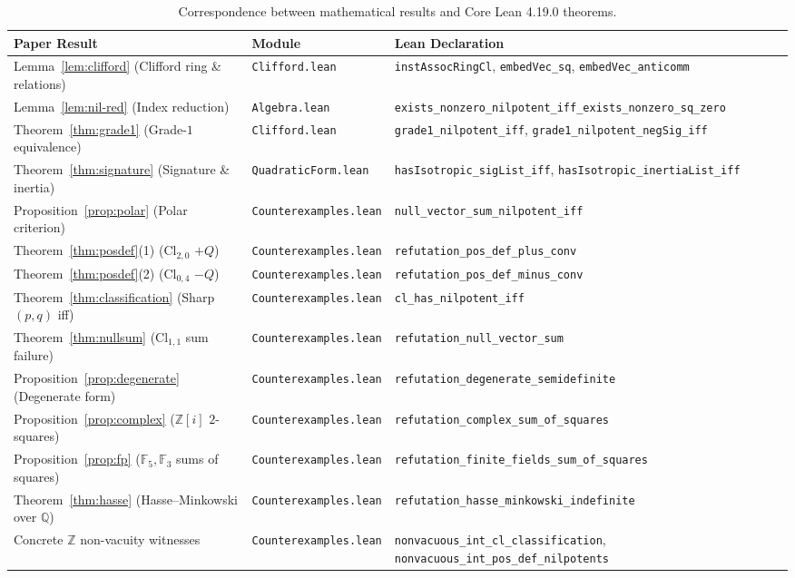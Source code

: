 \documentclass[11pt]{article}
\theoremstyle{definition}
\newcommand{\Cl}{\mathrm{Cl}}
\newcommand{\F}{\mathbb{F}}
\newcommand{\Q}{\mathbb{Q}}
\newcommand{\Z}{\mathbb{Z}}
\begin{document}
\begin{table}[ht]
\centering
\footnotesize
\renewcommand{\arraystretch}{1.16}
\begin{tabular}{@{}>{\raggedright\arraybackslash}p{}>{\raggedright\arraybackslash}p{}>{\raggedright\arraybackslash}p{}@{}}
\toprule
\textbf{Paper Result} & \textbf{Module} & \textbf{Lean Declaration} \\
\midrule
Lemma~\ref{lem:clifford} (Clifford ring \& relations) & \texttt{Clifford.lean} &
\texttt{instAssocRingCl}, \texttt{embedVec\_sq}, \texttt{embedVec\_anticomm} \\
Lemma~\ref{lem:nil-red} (Index reduction) & \texttt{Algebra.lean} &
\texttt{exists\_nonzero\_nilpotent\_iff\_}\penalty0\texttt{exists\_nonzero\_sq\_zero} \\
Theorem~\ref{thm:grade1} (Grade-$1$ equivalence) & \texttt{Clifford.lean} &
\texttt{grade1\_nilpotent\_iff}, \texttt{grade1\_nilpotent\_negSig\_iff} \\
Theorem~\ref{thm:signature} (Signature \& inertia) & \texttt{QuadraticForm.lean} &
\texttt{hasIsotropic\_sigList\_iff}, \texttt{hasIsotropic\_inertiaList\_iff} \\
Proposition~\ref{prop:polar} (Polar criterion) & \texttt{Counterexamples.lean} &
\texttt{null\_vector\_sum\_nilpotent\_iff} \\
Theorem~\ref{thm:posdef}(1) ($\Cl_{2,0}$ $+Q$) & \texttt{Counterexamples.lean} &
\texttt{refutation\_pos\_def\_plus\_conv} \\
Theorem~\ref{thm:posdef}(2) ($\Cl_{0,4}$ $-Q$) & \texttt{Counterexamples.lean} &
\texttt{refutation\_pos\_def\_minus\_conv} \\
Theorem~\ref{thm:classification} (Sharp $(p,q)$ iff) & \texttt{Counterexamples.lean} &
\texttt{cl\_has\_nilpotent\_iff} \\
Theorem~\ref{thm:nullsum} ($\Cl_{1,1}$ sum failure) & \texttt{Counterexamples.lean} &
\texttt{refutation\_null\_vector\_sum} \\
Proposition~\ref{prop:degenerate} (Degenerate form) & \texttt{Counterexamples.lean} &
\texttt{refutation\_degenerate\_semidefinite} \\
Proposition~\ref{prop:complex} ($\Z[i]$ $2$-squares) & \texttt{Counterexamples.lean} &
\texttt{refutation\_complex\_sum\_of\_squares} \\
Proposition~\ref{prop:fp} ($\F_5, \F_3$ sums of squares) & \texttt{Counterexamples.lean} &
\texttt{refutation\_finite\_fields\_sum\_of\_squares} \\
Theorem~\ref{thm:hasse} (Hasse--Minkowski over $\Q$) & \texttt{Counterexamples.lean} &
\texttt{refutation\_hasse\_minkowski\_indefinite} \\
Concrete $\Z$ non-vacuity witnesses & \texttt{Counterexamples.lean} &
\texttt{nonvacuous\_int\_cl\_classification}, \texttt{nonvacuous\_int\_pos\_def\_nilpotents} \\
\bottomrule
\end{tabular}
\caption{Correspondence between mathematical results and Core Lean 4.19.0 theorems.}
\label{tab:lean}
\end{table}
\end{document}

